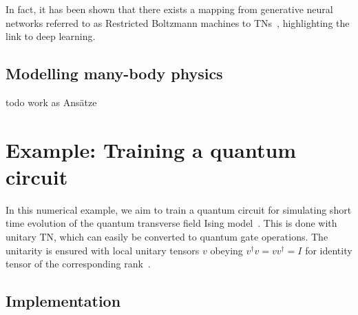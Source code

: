 In fact, it has been shown that there exists a mapping from generative neural networks referred to as Restricted Boltzmann machines to TNs~\cite{PhysRevB.97.085104}, highlighting the link to deep learning.


\subsection{Modelling many-body physics}

todo work as Ansätze









\section{Example: Training a quantum circuit}

In this numerical example, we aim to train a quantum circuit for simulating short time evolution of the quantum transverse field Ising model~\cite{Cervera-Lierta2018}. This is done with unitary TN, which can easily be converted to quantum gate operations. The unitarity is ensured with local unitary tensors $v$ obeying $v^\dagger v = vv^\dagger = I$ for identity tensor of the corresponding rank~\cite{Haghshenas2021}.

\subsection{Implementation}

